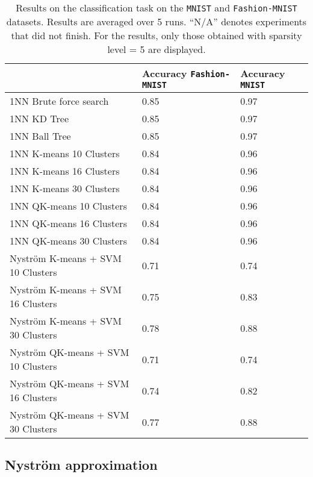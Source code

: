 \begin{table}[]

\centering
\begin{tabular}{@{}l|P{2.5cm}|P{2.5cm}}
\toprule
                                    & Accuracy \texttt{Fashion-MNIST} & Accuracy \texttt{MNIST} \\ \midrule
1NN Brute force search              &  0.85   &  0.97 \\
1NN KD Tree                         & 0.85  &  0.97  \\
1NN Ball Tree                       & 0.85  &  0.97  \\ \midrule \midrule
1NN K-means 10 Clusters            & 0.84  &  0.96  \\
1NN K-means 16 Clusters            & 0.84  &  0.96  \\
1NN K-means 30 Clusters            & 0.84  &  0.96  \\ \midrule
1NN QK-means 10 Clusters           & 0.84  &  0.96  \\
1NN QK-means 16 Clusters           & 0.84  &  0.96  \\
1NN QK-means 30 Clusters           & 0.84  &  0.96  \\ \midrule \midrule
Nyström K-means + SVM 10 Clusters  &  0.71  & 0.74  \\
Nyström K-means + SVM 16 Clusters  &  0.75  & 0.83  \\
Nyström K-means + SVM 30 Clusters  &  0.78  & 0.88  \\ \midrule
Nyström QK-means + SVM 10 Clusters &  0.71  & 0.74  \\
Nyström QK-means + SVM 16 Clusters &  0.74  & 0.82  \\
Nyström QK-means + SVM 30 Clusters &  0.77  & 0.88  \\ \bottomrule
\end{tabular}

\caption{Results on the classification task on the \texttt{MNIST} and \texttt{Fashion-MNIST} datasets. Results are averaged over 5 runs. ``N/A'' denotes experiments that did not finish. For the \qkmeans results, only those obtained with sparsity level = 5 are displayed.}
\label{table:results_mnist_fmnist}

\end{table}

\subsection{Nyström approximation}

